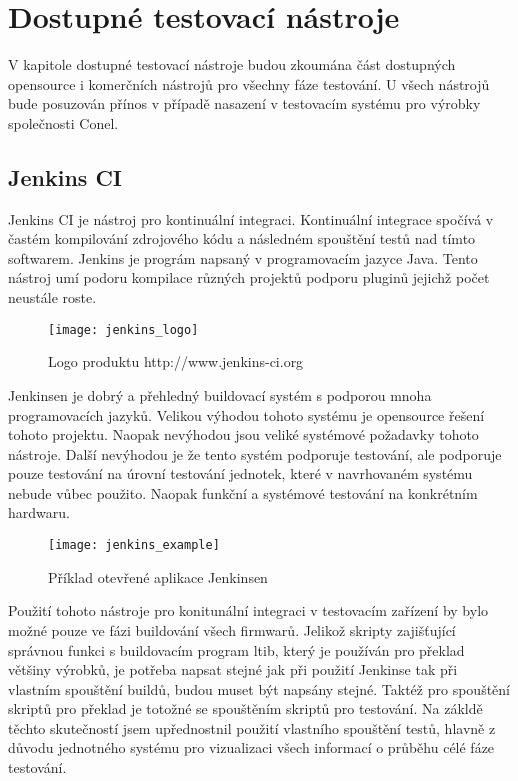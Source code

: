 \chapter{Dostupné testovací nástroje}
V kapitole dostupné testovací nástroje budou zkoumána část dostupných opensource i komerčních nástrojů pro všechny fáze testování. U všech nástrojů bude posuzován přínos v případě nasazení v testovacím systému pro výrobky společnosti Conel.

\section{Jenkins CI}
Jenkins CI je nástroj pro kontinuální integraci. Kontinuální integrace spočívá v častém kompilování zdrojového kódu a následném spouštění testů nad tímto softwarem.
Jenkins je prográm napsaný v programovacím jazyce Java. Tento nástroj umí podoru kompilace různých projektů podporu pluginů jejichž počet neustále roste.

\begin{figure}[h]
  \centering
  \texttt{[image: jenkins\_logo]}
  \caption{Logo produktu http://www.jenkins-ci.org}
  \label{fig:testlink_logo}
\end{figure}

Jenkinsen je dobrý a přehledný buildovací systém s podporou mnoha programovacích jazyků. Velikou výhodou tohoto systému je opensource řešení tohoto projektu. Naopak nevýhodou jsou veliké systémové požadavky tohoto nástroje. Další nevýhodou je že tento systém podporuje testování, ale podporuje pouze testování na úrovní testování jednotek, které v navrhovaném systému nebude vůbec použito. Naopak funkční a systémové testování na konkrétním hardwaru.

\begin{figure}[h]
  \centering
  \texttt{[image: jenkins\_example]}
  \caption{Příklad otevřené aplikace Jenkinsen}
  \label{fig:testlink_example}
\end{figure}

Použití tohoto nástroje pro konitunální integraci v testovacím zařízení by bylo možné pouze ve fázi buildování všech firmwarů. Jelikož skripty zajišťující správnou funkci s buildovacím program ltib, který je používán pro překlad většiny výrobků, je potřeba napsat stejné jak při použití Jenkinse tak při vlastním spouštění buildů, budou muset být napsány stejné. Taktéž pro spouštění skriptů pro překlad je totožné se spouštěním skriptů pro testování. Na zákldě těchto skutečností jsem upřednostnil použití vlastního spouštění testů, hlavně z důvodu jednotného systému pro vizualizaci všech informací o průběhu célé fáze testování.


